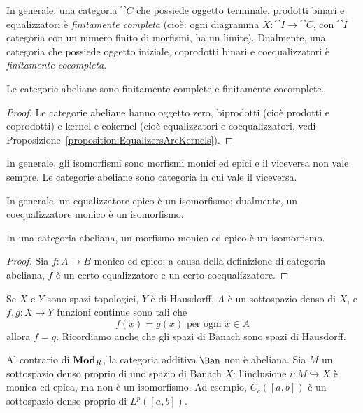 \begin{recall}
  In generale, una categoria \(\cat C\) che possiede oggetto terminale,
  prodotti binari e equalizzatori è {\em finitamente completa} (cioè:
  ogni diagramma \(X : \cat I \to \cat C\), con \(\cat I\) categoria con
  un numero finito di morfismi, ha un limite). Dualmente, una categoria
  che possiede oggetto iniziale, coprodotti binari e coequalizzatori è
  {\em finitamente cocompleta}.
\end{recall}

\begin{proposition}
  Le categorie abeliane sono finitamente complete e finitamente
  cocomplete.
\end{proposition}

\begin{proof}
  Le categorie abeliane hanno oggetto zero, biprodotti (cioè prodotti e
  coprodotti) e kernel e cokernel (cioè equalizzatori e coequalizzatori,
  vedi Proposizione~\ref{proposition:EqualizersAreKernels}).
\end{proof}

In generale, gli isomorfismi sono morfismi monici ed epici e il
viceversa non vale sempre. Le categorie abeliane sono categoria in cui
vale il viceversa.

\begin{recall}
  In generale, un equalizzatore epico è un isomorfismo; dualmente, un
  coequalizzatore monico è un isomorfismo.
\end{recall}

\begin{proposition}
  In una categoria abeliana, un morfismo monico ed epico è un
  isomorfismo.
\end{proposition}

\begin{proof}
  Sia \(f : A \to B\) monico ed epico: a causa della definizione di
  categoria abeliana, \(f\) è un certo equalizzatore e un certo
  coequalizzatore.
\end{proof}

\begin{recall}
  Se \(X\) e \(Y\) sono spazi topologici, \(Y\) è di Hausdorff, \(A\) è
  un sottospazio denso di \(X\), e \(f, g : X \to Y\) funzioni continue
  sono tali che
  \[
    f(x) = g(x) \text{ per ogni } x \in A
  \]
  allora \(f = g\). Ricordiamo anche che gli spazi di Banach sono spazi
  di Hausdorff.
\end{recall}

\begin{example}
  Al contrario di \(\mathbf{Mod}_R\), la categoria additiva \(\Ban\) non è
  abeliana. Sia \(M\) un sottospazio denso proprio di uno spazio di
  Banach \(X\): l'inclusione \(i : M \hookrightarrow X\) è monica ed epica, ma non è
  un isomorfismo. Ad esempio, \(C_c([a, b])\) è un sottospazio denso proprio di
  \(L^p([a, b])\).
\end{example}

